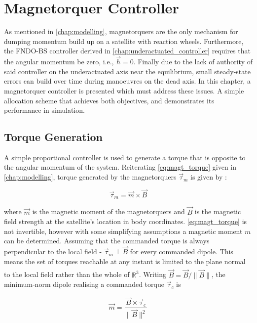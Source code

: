 \chapter{Magnetorquer Controller}

As mentioned in \autoref{chap:modelling}, magnetorquers are the only mechanism for dumping momentum build up on a satellite with reaction wheels. Furthermore, the FNDO-BS controller derived in \autoref{chap:underactuated_controller} requires that the angular momentum be zero, i.e., $\vec{h}=0$. Finally due to the lack of authority of said controller on the underactuated axis near the equilibrium, small steady-state errors can build over time during manoeuvres on the dead axis.  In this chapter, a magnetorquer controller is presented which must address these issues. A simple allocation scheme that achieves both objectives, and demonstrates its performance in simulation.

\section{Torque Generation}
A simple proportional controller is used to generate a torque that is opposite to the angular momentum of the system. Reiterating \autoref{eq:magt_torque} given in \autoref{chap:modelling}, torque generated by the magnetorquers $\vec{\tau}_m$ is given by \cite{sidiAttitudeDynamicsKinematics1997}:

\begin{equation*}
    \vec{\tau}_m = \vec{m} \times \vec{B}
    \label{eq:magt_torque_2}
\end{equation*}

where $\vec{m}$ is the magnetic moment of the magnetorquers and $\vec{B}$ is the magnetic field strength at the satellite's location in body coordinates. \autoref{eq:magt_torque} is not invertible, however with some simplifying assumptions a magnetic moment $m$ can be determined. Assuming that the commanded torque is always perpendicular to the local field - $\vec{\tau}_m \perp \vec{B}$ for every commanded dipole. This means the set of torques reachable at any instant is limited to the plane normal to the local field rather than the whole of $\mathbb{R}^3$. Writing $\hat{\vec{B}} = \vec{B}/\|\vec{B}\|$, the minimum-norm dipole realising a commanded torque $\vec{\tau}_c$ is \cite{sidiAttitudeDynamicsKinematics1997}

\begin{equation}
    \vec{m} = \frac{\vec{B} \times \vec{\tau}_c}{\|\vec{B}\|^2}
    \label{eq:magt_alloc}
\end{equation}

